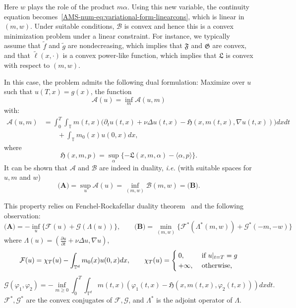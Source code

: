 \documentclass{amsproc}
\theoremstyle{definition}
\theoremstyle{remark}
\numberwithin{equation}{section}
\newcommand{\TT}{{\mathbb T}}
\newcommand{\cA}{{\mathcal A}}
\newcommand{\cB}{{\mathcal B}}
\newcommand{\cF}{{\mathcal F}}
\newcommand{\cG}{{\mathcal G}}
\newcommand{\ctrl}{\alpha}
\newcommand{\grad}{\nabla}
\begin{document}
Here $w$ plays the role of the product $m \ctrl$. Using this new variable, the continuity equation becomes~\eqref{AMS-num-eq:variational-form-linearcons}, which is linear in $(m,w)$. Under suitable conditions, $\cB$ is convex and hence this is a convex minimization problem under a linear constraint.  For instance, we typically assume that $\tilde f$ and $\tilde g$ are nondecreasing, which implies that $\mathfrak{F}$ and $\mathfrak{G}$ are convex, and that $\tilde \ell(x,\cdot)$ is a convex power-like function, which implies that $\mathfrak{L}$ is convex with respect to $(m,w)$. 
 




In this case, the problem admits the following dual formulation: Maximize over $u$ such that $u(T,x) = g(x)$, the function
 \begin{equation}
 \label{AMS-num-eq:variational-dual-A}
 	\cA(u) = \inf_{m} \cA(u, m)
 \end{equation}
 with:
\begin{align*}
	\cA(u,m)
	&=
	\int_0^T \int_{\TT}
	m(t,x) \Big(\partial_t u (t,x) + \nu \Delta u(t,x) - \mathfrak{H}(x, m(t,x), \nabla u(t,x))  \Big)
	dx dt
	\\
	&\qquad+
	\int_{\TT} m_0(x) u(0,x) dx,
\end{align*}
where
$$
	\mathfrak{H}(x,m,p) = \sup_{\ctrl} \{ - \mathfrak{L}(x,m,\ctrl) - \langle \ctrl, p \rangle \}.
$$
It can be shown that $\cA$ and $\cB$ are indeed in duality, \textit{i.e.} (with suitable spaces for $u, m$ and $w$)
$$
	\textbf{(A)} = \sup_{u} \cA(u) = \inf_{(m,w)} \cB(m,w) = \textbf{(B)}.
$$

This property relies on Fenchel-Rockafellar duality theorem~\cite{MR1451876} and the following observation:
$$
	\textbf{(A)}
	=
	- \inf_{u} \Big\{ \cF(u) + \cG(\Lambda(u)) \Big\},
	\qquad
	\textbf{(B)} = \min_{(m,w)} \Big\{ \cF^*(\Lambda^*(m,w)) + \cG^*(-m,-w)\Big\}
$$
where $ \Lambda(u)= \left(\frac{\partial u} {\partial t}   +   \nu \Delta u, \grad u \right)$, 
  \begin{equation*}
    \cF(u)= \chi_T(u)- \int_{\TT^d} m_0(x)u(0,x)dx, 
    \qquad
    \chi_T(u)=
    \begin{cases}
    0, & \hbox{ if } u|_{t=T} = g \\
    +\infty, & \hbox{ otherwise,}
    \end{cases}
  \end{equation*}
\begin{equation*}
\cG(\varphi_1, \varphi_2)= -\inf_{ m\ge 0    } \int_0^T \int_{\TT^d}    m(t,x) \left( \varphi_1(t,x) -  \mathfrak{H} (x, m(t,x), \varphi_2(t,x) )  \right)    dx dt   .
\end{equation*}
$\cF^*, \cG^*$ are the convex conjugates of $\cF,\cG$, and $\Lambda^*$ is the adjoint operator of $\Lambda$.
\end{document}
